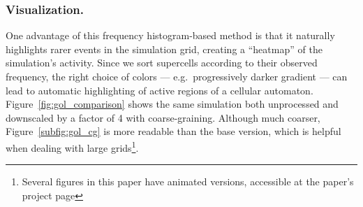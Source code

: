 \subsubsection{Visualization.}
One advantage of this frequency histogram-based method is that it naturally
highlights rarer events in the simulation grid, creating a ``heatmap'' of the
simulation's activity. Since we sort supercells according to their observed
frequency, the right choice of colors --- e.g.\ progressively darker gradient
--- can lead to automatic highlighting of active regions of a cellular
automaton. Figure~\ref{fig:gol_comparison} shows the same simulation both
unprocessed and downscaled by a factor of 4 with coarse-graining. Although much
coarser, Figure~\ref{subfig:gol_cg} is more readable than the base version,
which is helpful when dealing with large grids\footnote{Several figures in this
  paper have animated versions, accessible at the paper's project page
  \projecturl}.

